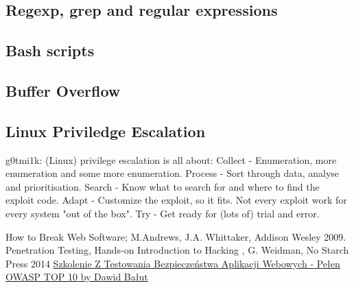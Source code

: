 \documentclass{article}[12pt]
\begin{document}

\subsection{Regexp, grep and regular expressions}
\subsection{Bash scripts}
\subsection{Buffer Overflow}



\subsection{Linux Priviledge Escalation}

g0tmi1k: (Linux) privilege escalation is all about:
\newline
Collect - Enumeration, more enumeration and some more enumeration.
Process - Sort through data, analyse and prioritisation.
Search - Know what to search for and where to find the exploit code.
Adapt - Customize the exploit, so it fits. Not every exploit work for every system "out of the box".
Try - Get ready for (lots of) trial and error.







\begin{thebibliography}{9}
How to Break Web Software; M.Andrews, J.A. Whittaker, Addison Wesley 2009.
Penetration Testing, Hands-on Introduction to Hacking , G. Weidman, No Starch Press 2014
\href{https://www.youtube.com/watch?v=04c0JiE8YNQ}{Szkolenie Z Testowania Bezpieczeństwa Aplikacji Webowych - Pełen OWASP TOP 10 by Dawid Bałut}
\end{thebibliography}
\end{document}
